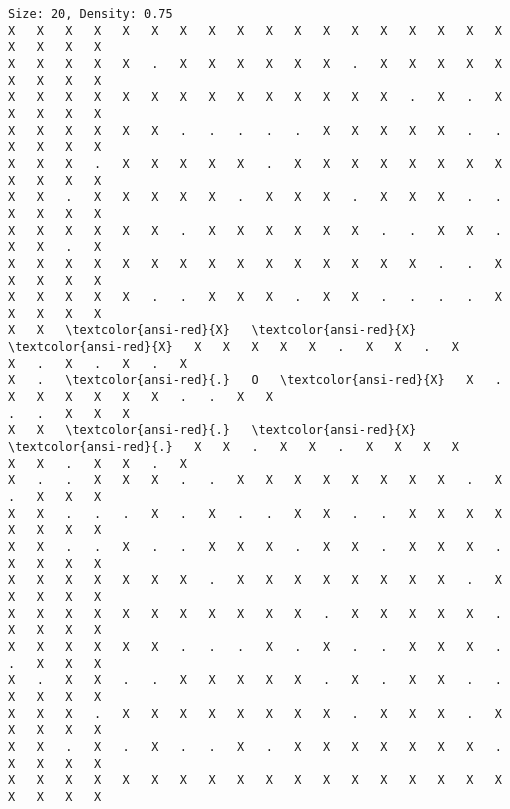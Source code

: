 \documentclass[11pt]{article}
\begin{document}
\begin{Verbatim}[commandchars=\\\{\},fontsize=\footnotesize]
Size: 20, Density: 0.75
X   X   X   X   X   X   X   X   X   X   X   X   X   X   X   X   X   X   X   X   X   X
X   X   X   X   X   .   X   X   X   X   X   X   .   X   X   X   X   X   X   X   X   X
X   X   X   X   X   X   X   X   X   X   X   X   X   X   .   X   .   X   X   X   X   X
X   X   X   X   X   X   .   .   .   .   .   X   X   X   X   X   .   .   X   X   X   X
X   X   X   .   X   X   X   X   X   .   X   X   X   X   X   X   X   X   X   X   X   X
X   X   .   X   X   X   X   X   .   X   X   X   .   X   X   X   .   .   X   X   X   X
X   X   X   X   X   X   .   X   X   X   X   X   X   .   .   X   X   .   X   X   .   X
X   X   X   X   X   X   X   X   X   X   X   X   X   X   X   .   .   X   X   X   X   X
X   X   X   X   X   .   .   X   X   X   .   X   X   .   .   .   .   X   X   X   X   X
X   X   \textcolor{ansi-red}{X}   \textcolor{ansi-red}{X}   \textcolor{ansi-red}{X}   X   X   X   X   X   .   X   X   .   X
X   .   X   .   X   .   X
X   .   \textcolor{ansi-red}{.}   O   \textcolor{ansi-red}{X}   X   .   X   X   X   X   X   X   .   .   X   X
.   .   X   X   X
X   X   \textcolor{ansi-red}{.}   \textcolor{ansi-red}{X}   \textcolor{ansi-red}{.}   X   X   .   X   X   .   X   X   X   X
X   X   .   X   X   .   X
X   .   .   X   X   X   .   .   X   X   X   X   X   X   X   X   .   X   .   X   X   X
X   X   .   .   .   X   .   X   .   .   X   X   .   .   X   X   X   X   X   X   X   X
X   X   .   .   X   .   .   X   X   X   .   X   X   .   X   X   X   .   X   X   X   X
X   X   X   X   X   X   X   .   X   X   X   X   X   X   X   X   .   X   X   X   X   X
X   X   X   X   X   X   X   X   X   X   X   .   X   X   X   X   X   .   X   X   X   X
X   X   X   X   X   X   .   .   .   X   .   X   .   .   X   X   X   .   .   X   X   X
X   .   X   X   .   .   X   X   X   X   X   .   X   .   X   X   .   .   X   X   X   X
X   X   X   .   X   X   X   X   X   X   X   X   .   X   X   X   .   X   X   X   X   X
X   X   .   X   .   X   .   .   X   .   X   X   X   X   X   X   X   .   X   X   X   X
X   X   X   X   X   X   X   X   X   X   X   X   X   X   X   X   X   X   X   X   X   X


    \end{Verbatim}
\end{document}
